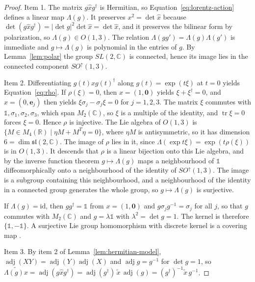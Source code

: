 	\begin{proof}
		Item 1. The matrix $g\hat{x}g^\dagger$ is Hermitian, so Equation~\eqref{eq:lorentz-action} defines a linear map $\Lambda(g)$. It preserves $x^2=\det\hat{x}$ because $\det(g\hat{x}g^\dagger)=|\det g|^2\det\hat{x}=\det\hat{x}$, and it preserves the bilinear form by polarization, so $\Lambda(g)\in O(1,3)$. The relation $\Lambda(gg')=\Lambda(g)\Lambda(g')$ is immediate and $g\mapsto\Lambda(g)$ is polynomial in the entries of $g$. By Lemma~\ref{lem:polar} the group $SL(2,\mathbb{C})$ is connected, hence its image lies in the connected component $SO^\uparrow(1,3)$.
		
		Item 2. Differentiating $g(t)\hat{x}g(t)^\dagger$ along $g(t)=\exp(t\xi)$ at $t=0$ yields Equation~\eqref{eq:rho}. If $\rho(\xi)=0$, then $x=(1,\mathbf{0})$ yields $\xi+\xi^\dagger=0$, and $x=(0,\mathbf{e}_j)$ then yields $\xi\sigma_j-\sigma_j\xi=0$ for $j=1,2,3$. The matrix $\xi$ commutes with $\mathbb{1},\sigma_1,\sigma_2,\sigma_3$, which span $M_2(\mathbb{C})$, so $\xi$ is a multiple of the identity, and $\operatorname{tr}\xi=0$ forces $\xi=0$. Hence $\rho$ is injective. The Lie algebra of $O(1,3)$ is $\{M\in M_4(\mathbb{R})\mid\eta M+M^T\eta=0\}$, where $\eta M$ is antisymmetric, so it has dimension $6=\dim\mathfrak{sl}(2,\mathbb{C})$. The image of $\rho$ lies in it, since $\Lambda(\exp t\xi)=\exp(t\rho(\xi))$ is in $O(1,3)$. It descends that $\rho$ is a linear bijection onto this Lie algebra, and by the inverse function theorem $g\mapsto\Lambda(g)$ maps a neighbourhood of $\mathbb{1}$ diffeomorphically onto a neighbourhood of the identity of $SO^\uparrow(1,3)$. The image is a subgroup containing this neighbourhood, and a neighbourhood of the identity in a connected group generates the whole group, so $g\mapsto\Lambda(g)$ is surjective.
		
		If $\Lambda(g)=\mathrm{id}$, then $gg^\dagger=\mathbb{1}$ from $x=(1,\mathbf{0})$ and $g\sigma_jg^{-1}=\sigma_j$ for all $j$, so that $g$ commutes with $M_2(\mathbb{C})$ and $g=\lambda\mathbb{1}$ with $\lambda^2=\det g=1$. The kernel is therefore $\{\mathbb{1},-\mathbb{1}\}$. A surjective Lie group homomorphism with discrete kernel is a covering map \cite[TODO-location]{TODO-Lee13}.
		
		Item 3. By item 2 of Lemma~\ref{lem:hermitian-model}, $\operatorname{adj}(XY)=\operatorname{adj}(Y)\operatorname{adj}(X)$ and $\operatorname{adj}g=g^{-1}$ for $\det g=1$, so $\widetilde{\Lambda(g)x}=\operatorname{adj}(g\hat{x}g^\dagger)=\operatorname{adj}(g^\dagger)\,\tilde{x}\,\operatorname{adj}(g)=(g^\dagger)^{-1}\tilde{x}\,g^{-1}$.
	\end{proof}
	
